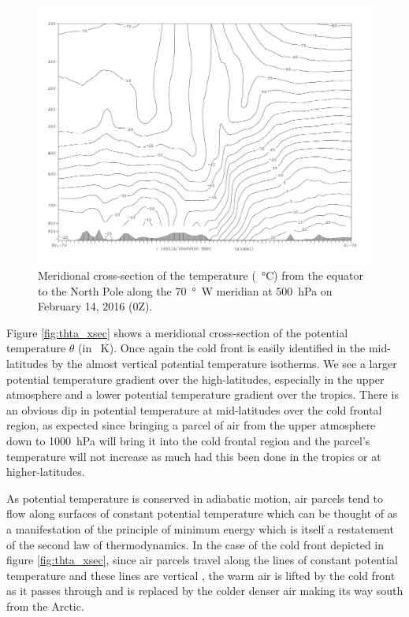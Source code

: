 \documentclass[11pt]{article}
\begin{document}
\begin{figure}[h!]
	\centering
	\includegraphics[width=\textwidth]{tmpc_0-90N_70W}
	\caption{Meridional cross-section of the temperature (\SI{}{\degreeCelsius}) from the equator to the North Pole along the \SI{70}{\degree W} meridian at \SI{500}{\hecto\Pa} on February 14, 2016 (0Z).}
	\label{fig:tmpc_xsec}
\end{figure}

Figure \ref{fig:thta_xsec} shows a meridional cross-section of the potential temperature $\theta$ (in \SI{}{\K}). Once again the cold front is easily identified in the mid-latitudes by the almost vertical potential temperature isotherms. We see a larger potential temperature gradient over the high-latitudes, especially in the upper atmosphere and a lower potential temperature gradient over the tropics. There is an obvious dip in potential temperature at mid-latitudes over the cold frontal region, as expected since bringing a parcel of air from the upper atmosphere down to \SI{1000}{\hecto\Pa} will bring it into the cold frontal region and the parcel's temperature will not increase as much had this been done in the tropics or at higher-latitudes.

As potential temperature is conserved in adiabatic motion, air parcels tend to flow along surfaces of constant potential temperature which can be thought of as a manifestation of the principle of minimum energy which is itself a restatement of the second law of thermodynamics. In the case of the cold front depicted in figure \ref{fig:thta_xsec}, since air parcels travel along the lines of constant potential temperature and these lines are vertical , the warm air is lifted by the cold front as it passes through and is replaced by the colder denser air making its way south from the Arctic.
\end{document}
